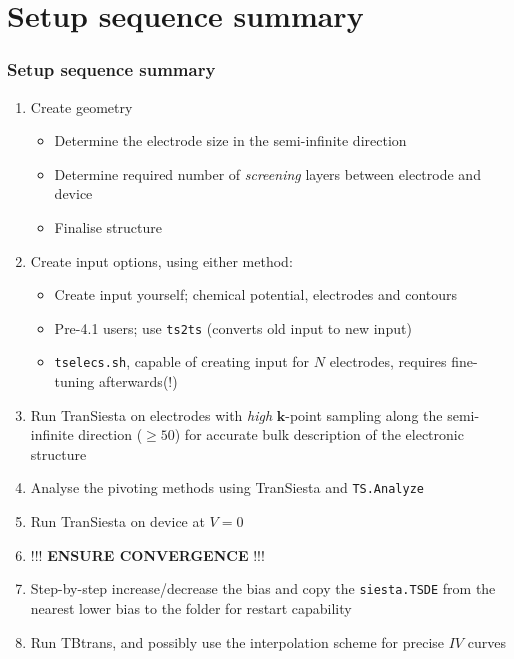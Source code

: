 \section{Setup sequence summary}

\begin{frame}
  \frametitle{Setup sequence summary}

  \begin{enumerate}[<+->]

    \item Create geometry
    \begin{itemize}
      \item Determine the electrode size in the semi-infinite direction

      \item Determine required number of \emph{screening} layers between electrode and device
      \item Finalise structure
    \end{itemize}

    \item Create input options, using either method:
    \begin{itemize}
      \item Create input yourself; chemical potential, electrodes and contours

      \item Pre-4.1 users; use \texttt{ts2ts} (converts old input to new input)

      \item \texttt{tselecs.sh}, capable of creating input for $N$ electrodes, requires
      fine-tuning afterwards(!)

    \end{itemize}
    
    \item Run TranSiesta on electrodes with \emph{high} $\mathbf k$-point sampling along
    the semi-infinite direction ($\ge50$)
    for accurate bulk description of the electronic structure

    \item Analyse the pivoting methods using TranSiesta and \texttt{TS.Analyze}

    \item Run TranSiesta on device at $V=0$

    \item !!! \textbf{ENSURE CONVERGENCE} !!!

    \item Step-by-step increase/decrease the bias and copy the \texttt{siesta.TSDE} from
    the nearest lower bias to the folder for restart capability

    \item Run TBtrans, and possibly use the interpolation scheme for precise $IV$ curves
    
  \end{enumerate}

\end{frame}

